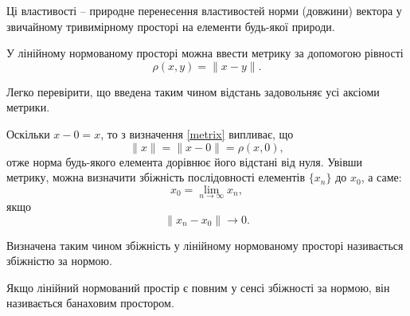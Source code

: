 \documentclass[14pt,twoside]{extreport}
\theoremstyle{mystyle}
\numberwithin{equation}{chapter}
\begin{document}
Ці властивості -- природне перенесення властивостей норми (довжини) вектора у звичайному тривимірному просторі на елементи будь-якої природи.

У лінійному нормованому просторі можна ввести метрику за допомогою рівності
\begin{equation}\label{metrix}
\rho(x, y) = \|x-y\|.
\end{equation}

Легко перевірити, що введена таким чином відстань задовольняє усі аксіоми метрики.

Оскільки $x - 0 = x$, то з визначення \eqref{metrix} випливає, що
\[
\|x\| = \|x-0\|=\rho(x, 0),
\]
отже норма будь-якого елемента дорівнює його відстані від нуля. Увівши метрику, можна визначити збіжність послідовності елементів $\{x_n\}$ до $x_0$, а саме:
\[
x_0 = \lim\limits_{n\to\infty} x_n,
\]
якщо
\[
\|x_n - x_0\| \to 0.
\]

Визначена таким чином збіжність у лінійному нормованому просторі називається збіжністю за нормою.

Якщо лінійний нормований простір є повним у сенсі збіжності за нормою, він називається банаховим простором.
\end{document}
